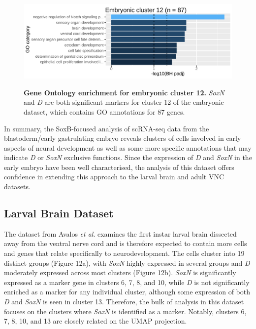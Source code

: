 \documentclass[withindex,glossary]{cam-thesis}
\begin{document}
\setcounter{figure}{11-1}
\begin{figure}[htbp]
\centering
\includegraphics[width=\dimexpr\textwidth\relax,keepaspectratio]{figs/Fig11 zinzen cluster12.pdf}
\label{fig11}
\caption{\textbf{Gene Ontology enrichment for embryonic cluster 12.} \emph{SoxN} and \emph{D} are both significant markers for cluster 12 of the embryonic dataset, which contains GO annotations for 87 genes.}
\end{figure}

In summary, the SoxB-focused analysis of scRNA-seq data from the
blastoderm/early gastrulating embryo reveals clusters of cells involved
in early aspects of neural development as well as some more specific
annotations that may indicate \emph{D} or \emph{SoxN} exclusive
functions. Since the expression of \emph{D} and \emph{SoxN} in the early
embryo have been well characterised, the analysis of this dataset offers
confidence in extending this approach to the larval brain and adult VNC
datasets.

\subsection{Larval Brain Dataset}

The dataset from Avalos \emph{et al}. examines the first instar larval
brain dissected away from the ventral nerve cord and is therefore
expected to contain more cells and genes that relate specifically to
neurodevelopment. The cells cluster into 19 distinct groups (Figure
12a), with \emph{SoxN} highly expressed in several groups and \emph{D}
moderately expressed across most clusters (Figure 12b). \emph{SoxN} is
significantly expressed as a marker gene in clusters 6, 7, 8, and 10,
while \emph{D} is not significantly enriched as a marker for any
individual cluster, although some expression of both \emph{D} and
\emph{SoxN} is seen in cluster 13. Therefore, the bulk of analysis in
this dataset focuses on the clusters where \emph{SoxN} is identified as
a marker. Notably, clusters 6, 7, 8, 10, and 13 are closely related on
the UMAP projection.
\end{document}
